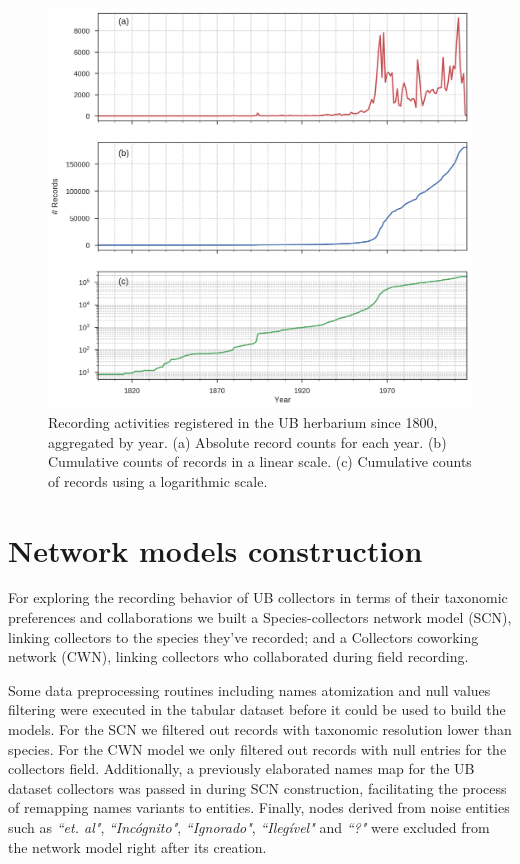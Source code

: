   \begin{figure}[h!]
  	\centering
    \includegraphics[width=\linewidth]{figures/ub_records_timeseries.png}
    \caption{Recording activities registered in the UB herbarium since 1800, aggregated by year. (a) Absolute record counts for each year. (b) Cumulative counts of records in a linear scale. (c) Cumulative counts of records using a logarithmic scale.}
    \label{fig:ub_records_timeseries}
  \end{figure}


\section{Network models construction}



For exploring the recording behavior of UB collectors in terms of their taxonomic preferences and collaborations we built a Species-collectors network model (SCN), linking collectors to the species they've recorded; and a Collectors coworking network (CWN), linking collectors who collaborated during field recording.

Some data preprocessing routines including names atomization and null values filtering were executed in the tabular dataset before it could be used to build the models. 
For the SCN we filtered out records with taxonomic resolution lower than species.
For the CWN model we only filtered out records with null entries for the collectors field.
Additionally, a previously elaborated names map for the UB dataset collectors was passed in during SCN construction, facilitating the process of remapping names variants to entities. 
Finally, nodes derived from noise entities such as \textit{``et. al"}, \textit{``Incógnito"}, \textit{``Ignorado"}, \textit{``Ilegível"} and \textit{``?"} were excluded from the network model right after its creation.

